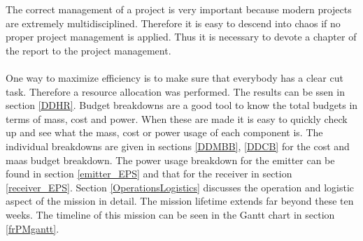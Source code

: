 The correct management of a project is very important because modern projects are extremely multidisciplined. Therefore it is easy to descend into chaos if no proper project management is applied. Thus it is necessary to devote a chapter of the report to the project management.
\\\\
One way to maximize efficiency is to make sure that everybody has a clear cut task. Therefore a resource allocation was performed. The results can be ssen in section \ref{DDHR}. Budget breakdowns are a good tool to know the total budgets in terms of mass, cost and power. When these are made it is easy to quickly check up and see what the mass, cost or power usage of each component is. The individual breakdowns are given in sections \ref{DDMBB}, \ref{DDCB} for the cost and maas budget breakdown. The power usage breakdown for the emitter can be found in section \ref{emitter_EPS} and that for the receiver in section \ref{receiver_EPS}.
Section \ref{OperationsLogistics} discusses the operation and logistic aspect of the mission in detail.
The mission lifetime extends far beyond these ten weeks. The timeline of this mission can be seen in the Gantt chart in section \ref{frPMgantt}.